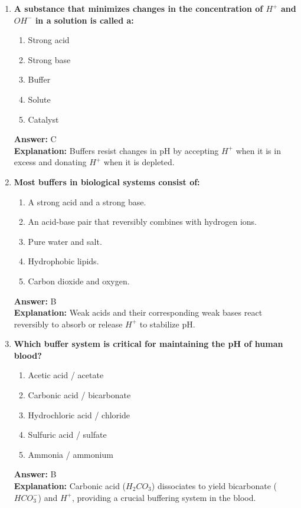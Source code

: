 \documentclass[11pt, a4paper]{article}
\begin{document}
\begin{enumerate}

\item \textbf{A substance that minimizes changes in the concentration of $H^+$ and $OH^-$ in a solution is called a:}
\begin{enumerate}[label=\Alph*.]
    \item Strong acid
    \item Strong base
    \item Buffer
    \item Solute
    \item Catalyst
\end{enumerate}
\textbf{Answer:} C \\
\textbf{Explanation:} Buffers resist changes in pH by accepting $H^+$ when it is in excess and donating $H^+$ when it is depleted.

\item \textbf{Most buffers in biological systems consist of:}
\begin{enumerate}[label=\Alph*.]
    \item A strong acid and a strong base.
    \item An acid-base pair that reversibly combines with hydrogen ions.
    \item Pure water and salt.
    \item Hydrophobic lipids.
    \item Carbon dioxide and oxygen.
\end{enumerate}
\textbf{Answer:} B \\
\textbf{Explanation:} Weak acids and their corresponding weak bases react reversibly to absorb or release $H^+$ to stabilize pH.

\item \textbf{Which buffer system is critical for maintaining the pH of human blood?}
\begin{enumerate}[label=\Alph*.]
    \item Acetic acid / acetate
    \item Carbonic acid / bicarbonate
    \item Hydrochloric acid / chloride
    \item Sulfuric acid / sulfate
    \item Ammonia / ammonium
\end{enumerate}
\textbf{Answer:} B \\
\textbf{Explanation:} Carbonic acid ($H_2CO_3$) dissociates to yield bicarbonate ($HCO_3^-$) and $H^+$, providing a crucial buffering system in the blood.


\end{enumerate}
\end{document}
